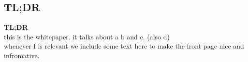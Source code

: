 
\subsection*{TL;DR}
\textbf{TL;DR}\\
this is the whitepaper. it talks about a b and c. (also d)\\
whenever f is relevant we include some text here to make the front page nice and infromative.